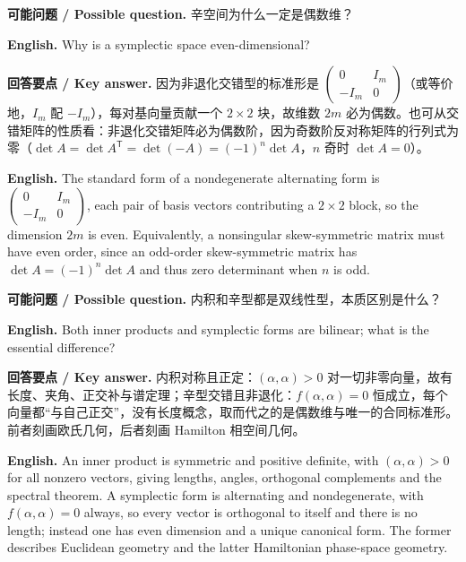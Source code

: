 \documentclass[UTF8,11pt,a4paper]{ctexart}
\newcommand{\EN}[1]{\par\noindent\textbf{English.} #1\par}
\newcommand{\ASK}[4]{\par\noindent\textbf{可能问题 / Possible question.} #1\par\EN{#2}\noindent\textbf{回答要点 / Key answer.} #3\par\EN{#4}\medskip}
\begin{document}
\ASK{辛空间为什么一定是偶数维？}{Why is a symplectic space even-dimensional?}{因为非退化交错型的标准形是 $\begin{pmatrix}0&I_m\\-I_m&0\end{pmatrix}$（或等价地，$I_m$ 配 $-I_m$），每对基向量贡献一个 $2\times2$ 块，故维数 $2m$ 必为偶数。也可从交错矩阵的性质看：非退化交错矩阵必为偶数阶，因为奇数阶反对称矩阵的行列式为零（$\det A=\det A^{\mathsf T}=\det(-A)=(-1)^n\det A$，$n$ 奇时 $\det A=0$）。}{The standard form of a nondegenerate alternating form is $\begin{pmatrix}0&I_m\\-I_m&0\end{pmatrix}$, each pair of basis vectors contributing a $2\times2$ block, so the dimension $2m$ is even. Equivalently, a nonsingular skew-symmetric matrix must have even order, since an odd-order skew-symmetric matrix has $\det A=(-1)^n\det A$ and thus zero determinant when $n$ is odd.}
\ASK{内积和辛型都是双线性型，本质区别是什么？}{Both inner products and symplectic forms are bilinear; what is the essential difference?}{内积对称且正定：$(\alpha,\alpha)>0$ 对一切非零向量，故有长度、夹角、正交补与谱定理；辛型交错且非退化：$f(\alpha,\alpha)=0$ 恒成立，每个向量都“与自己正交”，没有长度概念，取而代之的是偶数维与唯一的合同标准形。前者刻画欧氏几何，后者刻画 Hamilton 相空间几何。}{An inner product is symmetric and positive definite, with $(\alpha,\alpha)>0$ for all nonzero vectors, giving lengths, angles, orthogonal complements and the spectral theorem. A symplectic form is alternating and nondegenerate, with $f(\alpha,\alpha)=0$ always, so every vector is orthogonal to itself and there is no length; instead one has even dimension and a unique canonical form. The former describes Euclidean geometry and the latter Hamiltonian phase-space geometry.}
\end{document}
